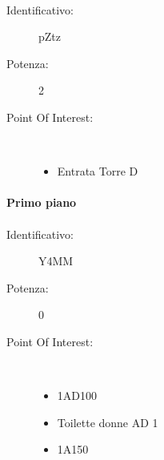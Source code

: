 \documentclass[../SperimentazioniPratiche.tex]{subfiles}
\begin{document}
			\paragraph*{}
			\label{00003}
			\begin{tcolorbox}[fonttitle=\bfseries, 
								adjusted title={\Large Beacon 00003},
								sharp corners=south,
								colback=white, 
								colframe=white!50!blue!75!black]
								
				\begin{description}%
					\item[Identificativo:] pZtz
					\item[Potenza:] 2

					\tcbline					
					
					\item[Point Of Interest:] \ \par
					\begin{itemize}
						\item Entrata Torre D
					\end{itemize}					   				
				\end{description}  				
			\end{tcolorbox}
			

			
		\paragraph{Primo piano}			
			
			\paragraph*{}
			\label{01000}
			\begin{tcolorbox}[fonttitle=\bfseries, 
								adjusted title={\Large Beacon 01000},
								sharp corners=south,
								colback=white, 
								colframe=white!50!blue!75!black]
								
				\begin{description}
					\item[Identificativo:] Y4MM
					\item[Potenza:] 0

					\tcbline					
					
					\item[Point Of Interest:] \ \par
					\begin{itemize}
						\item 1AD100
						\item Toilette donne AD 1
						\item 1A150
					\end{itemize}					   				
				\end{description}  				
			\end{tcolorbox}
			
\end{document}
